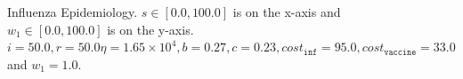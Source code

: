 \begin{figure}[h!]
    \centering
    \caption{Influenza Epidemiology. $ s \in \left[ 0.0, 100.0 \right]$ is on the x-axis and $ w_1 \in \left[ 0.0, 100.0 \right]$ is on the y-axis. $ i = 50.0, r = 50.0 \eta = 1.65 \times 10^4, b = 0.27, c = 0.23, cost_{\mathtt{inf}} = 95.0, cost_{\mathtt{vaccine}} = 33.0$ and $w_1 = 1.0 $.}
    \label{fig:robot1d}
\end{figure}

